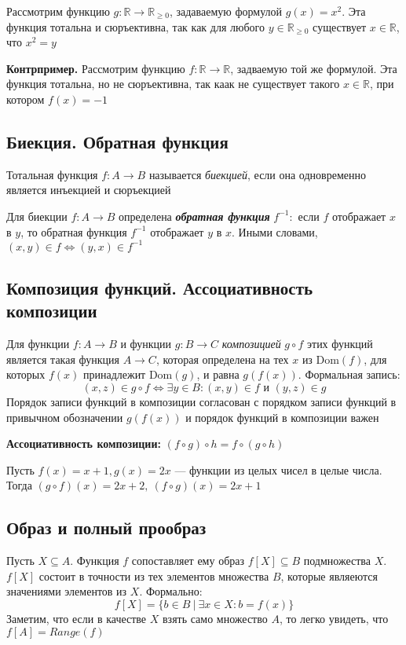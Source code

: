 \documentclass[a4paper]{article}
\begin{document}
\ex Рассмотрим функцию $g: \mathbb{R}\rightarrow\mathbb{R}_{\geqslant0}$, задаваемую формулой $g(x)=x^2$. Эта функция тотальна и сюръективна, так как для любого $y\in\mathbb{R}_{\geqslant0}$ существует $x\in\mathbb{R}$, что $x^2=y$

\textbf{Контрпример.} Рассмотрим функцию $f: \mathbb{R}\rightarrow\mathbb{R}$, задваемую той же формулой. Эта функция тотальна, но не сюръективна, так каак не существует такого $x\in \mathbb{R}$, при котором $f(x)=-1$


\subsection{Биекция. Обратная функция}
 Тотальная функция $f: A\rightarrow B$ называется \textit{биекцией}, если она одновременно является инъекцией и сюръекцией

Для биекции $f: A\rightarrow B$ определена \textbf{\textit{обратная функция}} $f^{-1}:$ если $f$ отображает $x$ в $y$, то обратная функция $f^{-1}$ отображает $y$ в $x$. Иными словами, $(x, y)\in f\Leftrightarrow(y, x)\in f^{-1}$

\subsection{Композиция функций. Ассоциативность композиции}
 Для функции $f: A\rightarrow B$ и функции $g: B\rightarrow C$ \textit{композицией} $g\circ f$ этих функций является такая функция $A\rightarrow C$, которая определена на тех $x$ из Dom$(f)$, для которых $f(x)$ принадлежит Dom$(g)$, и равна $g(f(x))$. Формальная запись:
\begin{equation*}
    (x,z)\in g\circ f\Longleftrightarrow\exists y\in B: (x,y)\in f\text{ и }(y,z)\in g
\end{equation*}
Порядок записи функций в композиции согласован с порядком записи функций
в привычном обозначении $g(f(x))$ и порядок функций в композиции важен

\textbf{Ассоциативность композиции:} $(f\circ g)\circ h=f\circ (g\circ h)$

\ex Пусть $f(x)=x+1, g(x)=2x$ — функции из целых чисел в целые числа. Тогда $(g\circ f)(x)=2x+2,\ (f\circ g)(x)=2x+1$

\subsection{Образ и полный прообраз}
 Пусть $X\subseteq A$. Функция $f$ сопоставляет ему образ $f[X]\subseteq B$ подмножества $X$. $f[X]$ состоит в точности из тех элементов множества $B$, которые являеются значениями элементов из $X$. Формально:
\begin{equation*}
    f[X]=\{b\in B\ |\ \exists x\in X: b=f(x)\}
\end{equation*}
Заметим, что если в качестве $X$ взять само множество $A$, то легко увидеть, что $f[A]={Range}(f)$
\end{document}
